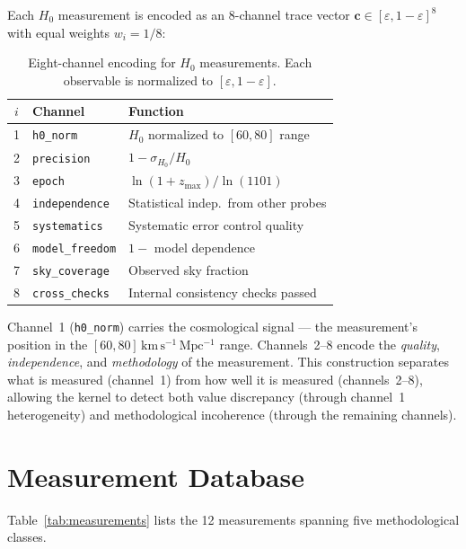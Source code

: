 \documentclass[
  aps,
  prd,
  twocolumn,
  superscriptaddress,
  nofootinbib,
  floatfix
]{revtex4-2}
\newcommand{\eps}{\varepsilon}
\newcommand{\tvec}{\mathbf{c}}
\begin{document}
Each $H_0$ measurement is encoded as an 8-channel trace vector
$\tvec \in [\eps, 1{-}\eps]^{8}$ with equal weights
$w_i = 1/8$:

\begin{table}[h]
\caption{\label{tab:channels}Eight-channel encoding for $H_0$
measurements. Each observable is normalized to $[\eps, 1{-}\eps]$.}
\begin{ruledtabular}
\begin{tabular}{clp{4.2cm}}
$i$ & Channel & Function \\
\hline
1 & \texttt{h0\_norm}      & $H_0$ normalized to $[60, 80]$ range \\
2 & \texttt{precision}     & $1 - \sigma_{H_0}/H_0$ \\
3 & \texttt{epoch}         & $\ln(1+z_{\max})/\ln(1101)$ \\
4 & \texttt{independence}  & Statistical indep.\ from other probes \\
5 & \texttt{systematics}   & Systematic error control quality \\
6 & \texttt{model\_freedom} & $1 - $ model dependence \\
7 & \texttt{sky\_coverage}  & Observed sky fraction \\
8 & \texttt{cross\_checks}  & Internal consistency checks passed \\
\end{tabular}
\end{ruledtabular}
\end{table}

Channel~1 (\texttt{h0\_norm}) carries the cosmological signal ---
the measurement's position in the $[60, 80]\,\mathrm{km\,s^{-1}\,Mpc^{-1}}$
range.
Channels~2--8 encode the \emph{quality}, \emph{independence}, and
\emph{methodology} of the measurement.
This construction separates what is measured (channel~1) from how
well it is measured (channels~2--8), allowing the kernel to detect
both value discrepancy (through channel~1 heterogeneity) and
methodological incoherence (through the remaining channels).

\section{Measurement Database}\label{sec:data}

Table~\ref{tab:measurements} lists the 12 measurements spanning
five methodological classes.
\end{document}
